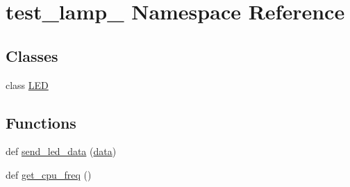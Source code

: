 \hypertarget{namespacetest__lamp__2}{}\section{test\+\_\+lamp\+\_ Namespace Reference}
\label{namespacetest__lamp__2}
\subsection*{Classes}
\begin{DoxyCompactItemize}
\item 
class \hyperlink{classtest__lamp__2_1_1LED}{L\+E\+D}
\end{DoxyCompactItemize}
\subsection*{Functions}
\begin{DoxyCompactItemize}
\item 
def \hyperlink{namespacetest__lamp__2_a8a01a07fc540e7acbad7058d2f772c95}{send\+\_\+led\+\_\+data} (\hyperlink{namespacetest__lamp__2_a980a603f356850f41fe96b73cbe1c759}{data})
\item 
def \hyperlink{namespacetest__lamp__2_aea63f8556354db64a9a9a4c2b2867db9}{get\+\_\+cpu\+\_\+freq} ()
\end{DoxyCompactItemize}
